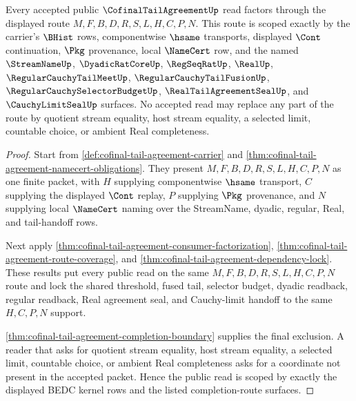 \begin{theorem}
\label{thm:cofinal-tail-agreement-scoped-kernel-route}
Every accepted public $\CofinalTailAgreementUp$ read factors through the displayed route $M,F,B,D,R,S,L,H,C,P,N$. This route is scoped exactly by the carrier's $\BHist$ rows, componentwise $\hsame$ transports, displayed $\Cont$ continuation, $\Pkg$ provenance, local $\NameCert$ row, and the named $\StreamNameUp$, $\DyadicRatCoreUp$, $\RegSeqRatUp$, $\RealUp$, $\RegularCauchyTailMeetUp$, $\RegularCauchyTailFusionUp$, $\RegularCauchySelectorBudgetUp$, $\RealTailAgreementSealUp$, and $\CauchyLimitSealUp$ surfaces. No accepted read may replace any part of the route by quotient stream equality, host stream equality, a selected limit, countable choice, or ambient Real completeness.
\end{theorem}
\begin{proof}
Start from \autoref{def:cofinal-tail-agreement-carrier} and \autoref{thm:cofinal-tail-agreement-namecert-obligations}. They present $M,F,B,D,R,S,L,H,C,P,N$ as one finite packet, with $H$ supplying componentwise $\hsame$ transport, $C$ supplying the displayed $\Cont$ replay, $P$ supplying $\Pkg$ provenance, and $N$ supplying local $\NameCert$ naming over the StreamName, dyadic, regular, Real, and tail-handoff rows.

Next apply \autoref{thm:cofinal-tail-agreement-consumer-factorization}, \autoref{thm:cofinal-tail-agreement-route-coverage}, and \autoref{thm:cofinal-tail-agreement-dependency-lock}. These results put every public read on the same $M,F,B,D,R,S,L,H,C,P,N$ route and lock the shared threshold, fused tail, selector budget, dyadic readback, regular readback, Real agreement seal, and Cauchy-limit handoff to the same $H,C,P,N$ support.

\autoref{thm:cofinal-tail-agreement-completion-boundary} supplies the final exclusion. A reader that asks for quotient stream equality, host stream equality, a selected limit, countable choice, or ambient Real completeness asks for a coordinate not present in the accepted packet. Hence the public read is scoped by exactly the displayed BEDC kernel rows and the listed completion-route surfaces.
\end{proof}




